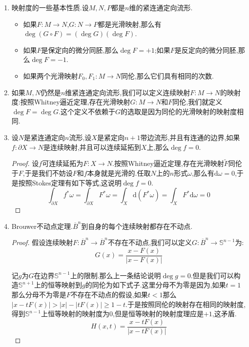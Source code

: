 \begin{enumerate}
\begin{proof}
    	最后假设$F^{-1}(q)$是空集,我们约定对空集的求和是零.按照$F(M)$是$N$的闭子集,此时$q$存在开邻域$W$包含在$N-F(M)$中.任取被$W$紧支撑的$N$上的$n$形式$\omega$,那么$\int_MF^*\omega=0$,于是$k=0$,完成证明.
    \end{proof}
    \item 映射度的一些基本性质.设$M,N,P$都是$n$维的紧连通定向流形.
    \begin{itemize}
    	\item 如果$F:M\to N$,$G:N\to P$都是光滑映射,那么有$\deg(G\circ F)=(\deg G)(\deg F)$.
    	\item 如果$F$是保定向的微分同胚,那么$\deg F=+1$;如果$F$是反定向的微分同胚,那么$\deg F=-1$.
    	\item 如果两个光滑映射$F_0,F_1:M\to N$同伦,那么它们具有相同的次数.
    \end{itemize}
    \item 如果$M,N$仍然是$n$维紧连通定向流形,我们可以定义连续映射$F:M\to N$的映射度:按照Whitney逼近定理,存在光滑映射$G:M\to N$和$F$同伦,我们就定义$\deg F=\deg G$.这个定义不依赖于$G$的选取是因为同伦的光滑映射的映射度相同.
    \item 设$N$是紧连通定向$n$流形,设$X$是紧定向$n+1$带边流形,并且有连通的边界,如果$f:\partial X\to N$是连续映射,并且可以连续延拓到$X$上,那么$\deg f=0$.
    \begin{proof}
    	
    	设$f$可连续延拓为$F:X\to N$.按照Whitney逼近定理,存在光滑映射$\widetilde{F}$同伦于$F$,于是我们不妨设$F$和$f$本身就是光滑的.任取$N$上的$n$形式$\omega$,那么有$\mathrm{d}\omega=0$,于是按照Stokes定理有如下等式,这说明$\deg f=0$.
    	$$\int_{\partial X}f^*\omega=\int_{\partial X}F^*\omega=\int_X\mathrm{d}(F^*\omega)=\int_XF^*\mathrm{d}\omega=0$$
    \end{proof}
    \item Brouwer不动点定理.$\overline{B}^n$到自身的每个连续映射都存在不动点.
    \begin{proof}
    	
    	假设连续映射$F:\overline{B}^n\to\overline{B}^n$不存在不动点,我们可以定义$G:\overline{B}^n\to\mathbb{S}^{n-1}$为:$$G(x)=\frac{x-F(x)}{|x-F(x)|}$$
    	
    	记$g$为$G$在边界$\mathbb{S}^{n-1}$上的限制.那么上一条结论说明$\deg g=0$.但是我们可以构造$\mathbb{S}^{n+1}$上的恒等映射到$g$的同伦为如下式子.这里分母不为零是因为,如果$t=1$那么分母不为零是$F$不存在不动点的假设,如果$t<1$那么$|x-tF(x)|>|x|-|tF(x)|\ge 1-t$.于是按照同伦的映射存在相同的映射度,得到$\mathbb{S}^{n-1}$上恒等映射的映射度为0,但是恒等映射的映射度理应是$+1$,这矛盾.
    	$$H(x,t)=\frac{x-tF(x)}{|x-tF(x)|}$$
    \end{proof}
\end{enumerate}

